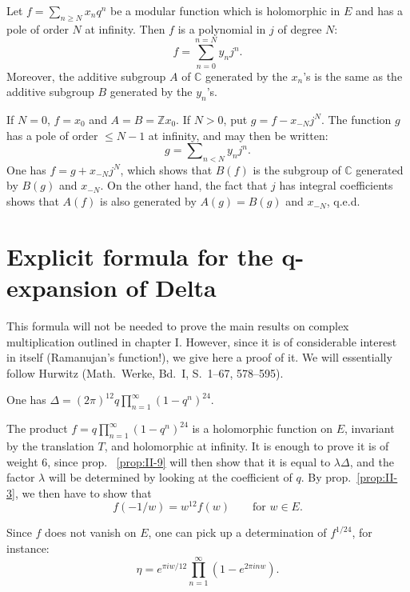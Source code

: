 \begin{proposition}\label{prop:II-qprin}
Let $f=\sum_{n\geq N}x_{n}q^{n}$ be a modular function which is
holomorphic in $E$ and has a pole of order $N$ at infinity. Then $f$ is a
polynomial in $j$ of degree $N$:
\[
f=\sum_{n=0}^{n=N}y_{n}j^{n}.
\]
Moreover, the additive subgroup $A$ of $\mathbb{C}$ generated by the
$x_{n}$'s is the same as the additive subgroup $B$ generated by the
$y_{n}$'s.
\end{proposition}

If $N=0$, $f=x_{0}$ and $A=B=\mathbb{Z}x_{0}$. If $N>0$, put
$g=f-x_{-N}j^{N}$. The function $g$ has a pole of order $\leq N-1$ at
infinity, and may then be written:
\[
g=\sum\nolimits_{n<N}y_{n}j^{n}.
\]
One has $f=g+x_{-N}j^{N}$, which shows that $B(f)$ is the subgroup of
$\mathbb{C}$ generated by $B(g)$ and $x_{-N}$. On the other hand, the
fact that $j$ has integral coefficients shows that $A(f)$ is also
generated by $A(g)=B(g)$ and $x_{-N}$, q.e.d.

\section{Explicit formula for the q-expansion of Delta}\label{sec:II-delta}

This formula will not be needed to prove the main results on complex
multiplication outlined in chapter I. However, since it is of considerable
interest in itself (Ramanujan's function!), we give here a proof of it.
We will essentially follow Hurwitz (Math.\ Werke, Bd.\ I, S.~1--67,
578--595).

\begin{proposition}\label{prop:II-13}
One has $\displaystyle\Delta=(2\pi)^{12}q\prod_{n=1}^{\infty}(1-q^{n})^{24}$.
\end{proposition}

The product $f=q\prod_{n=1}^{\infty}(1-q^{n})^{24}$ is a holomorphic
function on $E$, invariant by the translation $T$, and holomorphic at
infinity. It is enough to prove it is of weight $6$, since prop.~%
\ref{prop:II-9} will then show that it is equal to $\lambda\Delta$, and
the factor $\lambda$ will be determined by looking at the coefficient of
$q$. By prop.~\ref{prop:II-3}, we then have to show that
\[
f(-1/w)=w^{12}f(w)\qquad\text{for }w\in E.
\tag{16}\label{eq:II-16}
\]

Since $f$ does not vanish on $E$, one can pick up a determination of
$f^{1/24}$, for instance:
\[
\eta=e^{\pi iw/12}\prod_{n=1}^{\infty}(1-e^{2\pi inw}).
\]

